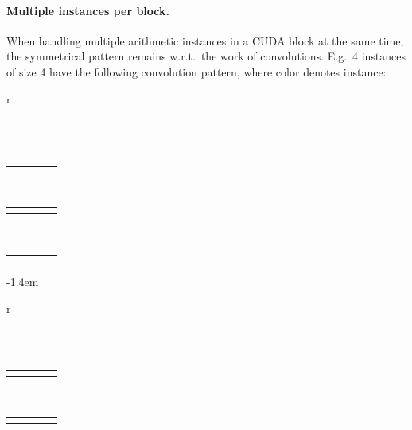 \paragraph{Multiple instances per block.}
When handling multiple arithmetic instances in a CUDA block at the same time,
the symmetrical pattern remains w.r.t.\ the work of convolutions. E.g.\ 4
instances of size 4 have the following convolution pattern, where color denotes
instance:
\begin{center}
  \begin{tabular}{r}
    \begin{tabular}{|C{0.1cm}|C{0.1cm}|C{0.1cm}|C{0.1cm}|}
      \hline
       \cgray & \cgray &\cgray  &\cgray \\
      \hline
    \end{tabular}\\[0.1ex]
    \begin{tabular}{C{0.1cm}|C{0.1cm}|C{0.1cm}|C{0.1cm}|}
       & \cgray & \cgray & \cgray\\
    \end{tabular}\\[0.1ex]
    \begin{tabular}{C{0.1cm}C{0.1cm}|C{0.1cm}|C{0.1cm}|}
       &  & \cgray & \cgray\\
    \end{tabular}\\[0.1ex]
    \begin{tabular}{C{0.1cm}C{0.1cm}C{0.1cm}|C{0.1cm}|}
       &  &  & \cgray \\
    \end{tabular}
  \end{tabular}
  \kern-1.4em
  \begin{tabular}{r}
    \begin{tabular}{C{0.1cm}|C{0.1cm}|C{0.1cm}|C{0.1cm}|}
      \hline
      \cbeige &\cbeige  &\cbeige  &\cbeige \\
      \hline
    \end{tabular}\\[0.1ex]
    \begin{tabular}{C{0.1cm}|C{0.1cm}|C{0.1cm}|C{0.1cm}|}
       & \cbeige & \cbeige & \cbeige\\
    \end{tabular}\\[0.1ex]
    \begin{tabular}{C{0.1cm}C{0.1cm}|C{0.1cm}|C{0.1cm}|}
       &  & \cbeige &\cbeige \\

\end{tabular}
\end{tabular}
\end{center}
